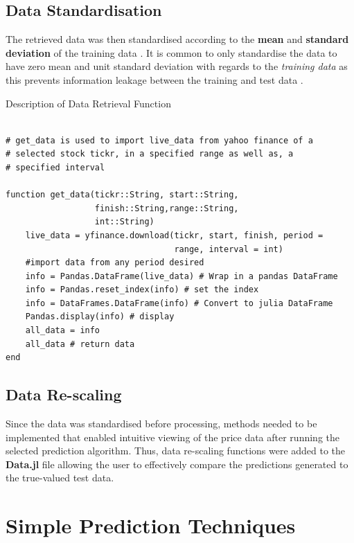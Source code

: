 \subsection{Data Standardisation}

\noindent The retrieved data was then standardised according to the \textbf{mean} and \textbf{standard deviation} of the training data \cite{standard}. It is common to only standardise the data to have zero mean and unit standard deviation with regards to the \textit{training data} as this prevents information leakage between the training and test data \cite{why_standard}.

\begin{listing}
\caption{Description of Data Retrieval Function}
\label{lst: get_data}
\begin{verbatim}

# get_data is used to import live_data from yahoo finance of a  
# selected stock tickr, in a specified range as well as, a  
# specified interval

function get_data(tickr::String, start::String, 
                  finish::String,range::String,    
                  int::String)
    live_data = yfinance.download(tickr, start, finish, period = 
                                  range, interval = int) 
    #import data from any period desired
    info = Pandas.DataFrame(live_data) # Wrap in a pandas DataFrame
    info = Pandas.reset_index(info) # set the index 
    info = DataFrames.DataFrame(info) # Convert to julia DataFrame
    Pandas.display(info) # display
    all_data = info
    all_data # return data
end

\end{verbatim}
\end{listing}

\subsection{Data Re-scaling}

\noindent Since the data was standardised before processing, methods needed to be implemented that enabled intuitive viewing of the price data after running the selected prediction algorithm. Thus, data re-scaling functions were added to the \textbf{Data.jl} file allowing the user to effectively compare the predictions generated to the true-valued test data.

\section{Simple Prediction Techniques}


